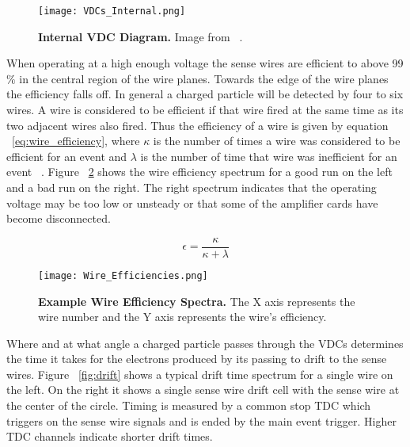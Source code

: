 \begin{figure}[!ht]
\begin{center}
\texttt{[image: VDCs\_Internal.png]}
\end{center}
\caption{
{\bf{Internal VDC Diagram.}} Image from ~\cite{Article:VDCs}.}
\label{fig:vdcs_interior}
\end{figure}

When operating at a high enough voltage the sense wires are efficient to above 99$\%$ in the central region of the wire planes. Towards the edge of the wire planes the efficiency falls off. In general a charged particle will be detected by four to six wires. A wire is considered to be efficient if that wire fired at the same time as its two adjacent wires also fired. Thus the efficiency of a wire is given by equation ~\ref{eq:wire_efficiency}, where $\kappa$ is the number of times a wire was considered to be efficient for an event and $\lambda$ is the number of time that wire was inefficient for an event ~\cite{Article:VDCs}. Figure ~\ref{fig:vdc_efficiency} shows the wire efficiency spectrum for a good run on the left and a bad run on the right. The right spectrum indicates that the operating voltage may be too low or unsteady or that some of the amplifier cards have become disconnected.

\begin{equation} \label{eq:wire_efficiency}
	\epsilon = \frac{\kappa}{\kappa + \lambda}
\end{equation}

\begin{figure}[!ht]
\begin{center}
\texttt{[image: Wire\_Efficiencies.png]}
\end{center}
\caption{
{\bf{Example Wire Efficiency Spectra.}} The X axis represents the wire number and the Y axis represents the wire's efficiency.}
\label{fig:vdc_efficiency}
\end{figure}

Where and at what angle a charged particle passes through the VDCs determines the time it takes for the electrons produced by its passing to drift to the sense wires. Figure ~\ref{fig:drift} shows a typical drift time spectrum for a single wire on the left. On the right it shows a single sense wire drift cell with the sense wire at the center of the circle. Timing is measured by a common stop TDC which triggers on the sense wire signals and is ended by the main event trigger. Higher TDC channels indicate shorter drift times.


